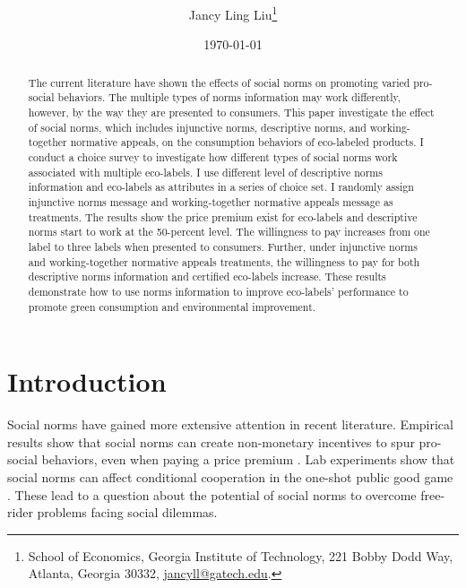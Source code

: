 \documentclass[12pt]{article}
\title{ \vspace*{-2.5cm} \hspace*{Social Norms in Public Provision vs Appropriation Game}}
\author{Jancy Ling Liu\thanks{School of Economics, Georgia Institute of Technology, 221 Bobby Dodd Way, Atlanta, Georgia 30332, \href{mailto:jancyll@gatech.edu}{jancyll@gatech.edu}.} }
\date{\today}
\begin{document}
\maketitle

\begin{abstract}
\singlespacing \noindent The current literature have shown the effects of social norms on promoting varied pro-social behaviors. The multiple types of norms information may work differently, however, by the way they are presented to consumers. This paper investigate the effect of social norms, which includes injunctive norms, descriptive norms, and working-together normative appeals, on the consumption behaviors of eco-labeled products. I conduct a choice survey to investigate how different types of social norms work associated with multiple eco-labels. I use different level of descriptive norms information and eco-labels as attributes in a series of choice set. I randomly assign injunctive norms message and working-together normative appeals message as treatments. The results show the price premium exist for eco-labels and descriptive norms start to work at the 50-percent level. The willingness to pay increases from one label to three labels when presented to consumers. Further, under injunctive norms and working-together normative appeals treatments, the willingness to pay for both descriptive norms information and certified eco-labels increase. These results demonstrate how to use norms information to improve eco-labels’ performance to promote green consumption and environmental improvement.

\end{abstract}

\newpage
\section{Introduction 
\label{sec:introduction}}

Social norms have gained more extensive attention in recent literature. Empirical results show that social norms can create non-monetary incentives to spur pro-social behaviors, even when paying a price premium \citep{carlsson2010conformity, allcott2011social, torres2018direct}. Lab experiments show that social norms can affect conditional cooperation in the one-shot public good game \citep{fehr2018normative,fischbacher2001people}. These lead to a question about the potential of social norms to overcome free-rider problems facing social dilemmas. 
\end{document}
